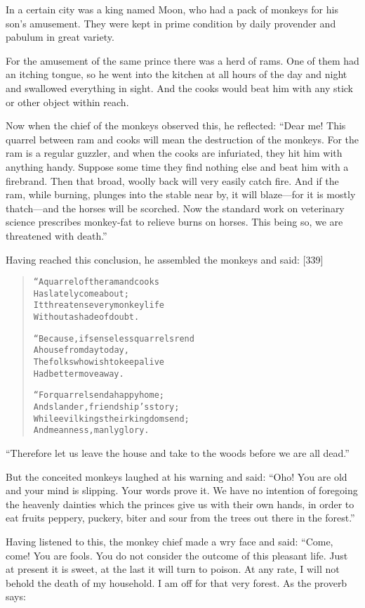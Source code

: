 \documentclass[article, twoside, 14pt]{memoir}
\renewenvironment{verbatim}{%
\begin{quote}%
\vskip -10pt%
\begin{alltt}\normalfont\large}{\end{alltt}%
\end{quote}%
\vskip -10pt
} %
\begin{document}
\label{s87}

In a certain city was a king named Moon, who had a pack of monkeys
for his son's amusement. They were kept in prime condition by daily
provender and pabulum in great variety.

For the amusement of the same prince there was a herd of rams. One
of them had an itching tongue, so he went into the kitchen at all
hours of the day and night and swallowed everything in sight. And
the cooks would beat him with any stick or other object within
reach.

Now when the chief of the monkeys observed this, he reflected:
``Dear me! This quarrel between ram and cooks will mean the destruction of the monkeys. For the ram is a regular guzzler, and when the cooks are infuriated, they hit him with anything handy. Suppose some time they find nothing else and beat him with a firebrand. Then that broad, woolly back will very easily catch fire. And if the ram, while burning, plunges into the stable near by, it will blaze---for it is mostly thatch---and the horses will be scorched. Now the standard work on veterinary science prescribes monkey-fat to relieve burns on horses. This being so, we are threatened with death.''

Having reached this conclusion, he assembled the monkeys and said:
[339]

\begin{verbatim}
“A quarrel of the ram and cooks
    Has lately come about;
It threatens every monkey life
    Without a shade of doubt.

“Because, if senseless quarrels rend
    A house from day to day,
The folks who wish to keep alive
    Had better move away.

“For quarrels end a happy home;
    And slander, friendship's story;
While evil kings their kingdoms end;
    And meanness, manly glory.
\end{verbatim}
``Therefore let us leave the house and take to the woods before we are all dead.''

But the conceited monkeys laughed at his warning and said:
``Oho! You are old and your mind is slipping. Your words prove it. We have no intention of foregoing the heavenly dainties which the princes give us with their own hands, in order to eat fruits peppery, puckery, biter and sour from the trees out there in the forest.''

Having listened to this, the monkey chief made a wry face and said:
“Come, come! You are fools. You do not consider the outcome of this
pleasant life. Just at present it is sweet, at the last it will
turn to poison. At any rate, I will not behold the death of my
household. I am off for that very forest. As the proverb says:
\end{document}
